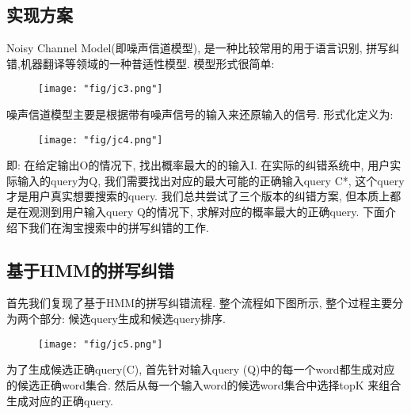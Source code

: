 \subsection{实现方案}

Noisy Channel Model(即噪声信道模型), 是一种比较常用的用于语言识别, 拼写纠错,机器翻译等领域的一种普适性模型. 模型形式很简单:

\begin{figure}[!h]
	\centering
	\texttt{[image: "fig/jc3.png"]}
	\caption{}
	\label{fig:jc3}
\end{figure}

噪声信道模型主要是根据带有噪声信号的输入来还原输入的信号. 形式化定义为:

\begin{figure}[!h]
	\centering
	\texttt{[image: "fig/jc4.png"]}
	\caption{}
	\label{fig:jc4}
\end{figure}

即: 在给定输出O的情况下, 找出概率最大的的输入I. 在实际的纠错系统中, 用户实际输入的query为Q, 我们需要找出对应的最大可能的正确输入query C*, 这个query才是用户真实想要搜索的query.  我们总共尝试了三个版本的纠错方案, 但本质上都是在观测到用户输入query Q的情况下, 求解对应的概率最大的正确query.  下面介绍下我们在淘宝搜索中的拼写纠错的工作.

\subsection{基于HMM的拼写纠错}

首先我们复现了基于HMM的拼写纠错流程. 整个流程如下图所示, 整个过程主要分为两个部分: 候选query生成和候选query排序. 

\begin{figure}[!h]
	\centering
	\texttt{[image: "fig/jc5.png"]}
	\caption{}
	\label{fig:jc5}
\end{figure}

为了生成候选正确query(C),  首先针对输入query (Q)中的每一个word都生成对应的候选正确word集合. 然后从每一个输入word的候选word集合中选择topK 来组合生成对应的正确query.

